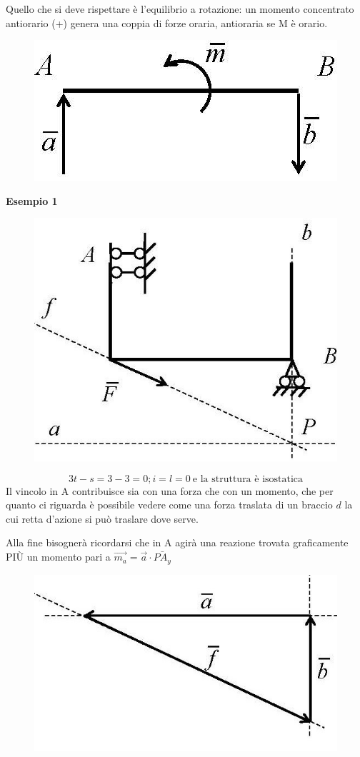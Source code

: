 \documentclass{article}
\begin{document}
\begin{adjustwidth}{2in}{}
Quello che si deve rispettare è l'equilibrio a rotazione: un momento concentrato antiorario (+) genera una coppia di forze oraria, antioraria se M è orario.  \newline
\begin{figure}[H]
	\centering
	\includegraphics[width=0.4\linewidth]{immagini/1.PARTE4_Pagina_25}
\end{figure}
\newpage
\textbf{Esempio 1}
\begin{figure}[H]
	\centering
	\includegraphics[width=0.4\linewidth]{immagini/1.PARTE4_Pagina_26 (2)}
\end{figure}
\[
3t - s = 3-3 = 0; i=l=0  ~ \text{e la struttura è isostatica}
\]
Il vincolo in A contribuisce sia con una forza che con un momento, che per quanto ci riguarda è possibile vedere come una forza traslata di un braccio $d$ la cui retta d'azione si può traslare dove serve. 

Alla fine bisognerà ricordarsi che in A agirà una reazione trovata graficamente PIÙ un momento pari a $\vec{m_a} = \vec{a} \cdot \bar{PA_y}$

\begin{figure}[H]
	\centering
	\includegraphics[width=0.15\linewidth]{immagini/1.PARTE4_Pagina_26}
\end{figure}


\end{adjustwidth}
\end{document}
